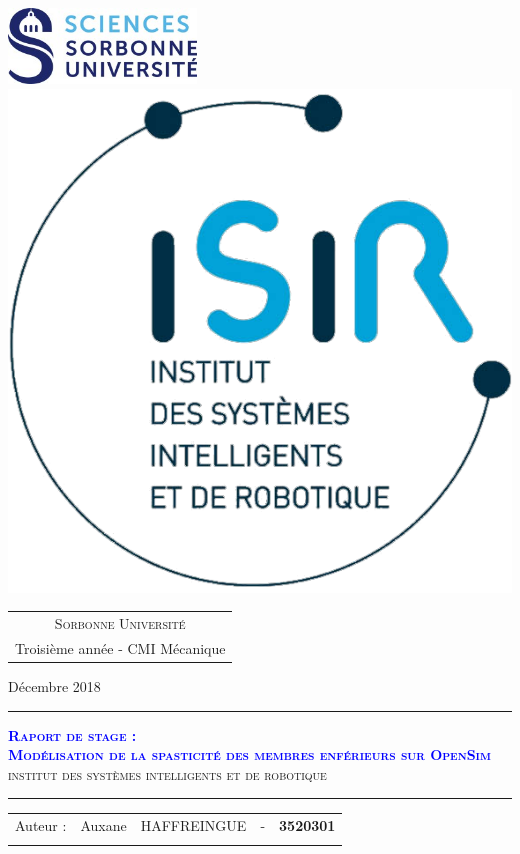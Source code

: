 \thispagestyle{empty}

\begin{titlepage}

\includegraphics[width = 5cm]{Images/SORBONNE_FAC_SCIENCES_DEF_RVB}
\includegraphics[width = 3 cm]{Images/Logo_ISIR}

\vspace{1cm}

\begin{center}
	\large{
		\begin{tabular}{c}
			\textsc{Sorbonne Université} \\
    		Troisième année - CMI Mécanique \\
		\end{tabular}
    }
\end{center}

\vspace{1cm}

\begin{center}
	\large{Décembre 2018}
\end{center}
%
\vspace{2cm}
%
\rule[0.6ex]{\textwidth}{0,3mm}
\begin{center}
	\textbf{\textcolor{Blue}{\textsc{\Huge Raport de stage :}}}\\
    \vspace{0.3cm}
    \textbf{\textcolor{Blue}{\textsc{\Huge Modélisation de la spasticité des membres enférieurs sur OpenSim }}}\\
    \vspace{0.5cm}
	\textcolor{Emerald}{\textsc{\LARGE{institut des systèmes intelligents et de robotique}}}\\
\end{center}
\rule[0.6ex]{\textwidth}{0,3mm}
%
\vspace{1cm}
%
\begin{table}[h!]
    \begin{center}
	\large{
    	\begin{tabular}{l c c c c}
		Auteur : & Auxane & \textsc{HAFFREINGUE} & - & \textbf{3520301}\\\\
		\end{tabular}}
	\end{center}
\end{table}


\end{titlepage}
